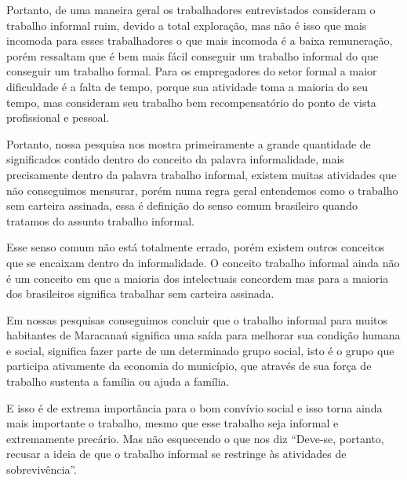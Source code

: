 Portanto, de uma maneira geral os trabalhadores entrevistados consideram o trabalho informal ruim, devido a total exploração, mas não é isso que mais incomoda para esses trabalhadores o que mais incomoda é a baixa remuneração, porém ressaltam que é bem mais fácil conseguir um trabalho informal do que conseguir um trabalho formal. Para os empregadores do setor formal a maior dificuldade é a falta de tempo, porque sua atividade toma a maioria do seu tempo, mas consideram seu trabalho bem recompensatório do ponto de vista profissional e pessoal. 




































Portanto, nossa pesquisa nos mostra primeiramente a grande quantidade de 
significados contido dentro do conceito da palavra informalidade, mais 
precisamente dentro da palavra trabalho informal, existem muitas atividades que 
não conseguimos mensurar, porém numa regra geral entendemos como o trabalho sem 
carteira assinada, essa é definição do senso comum brasileiro quando tratamos do 
assunto trabalho informal. 

Esse senso comum não está totalmente errado, porém 
existem outros conceitos que se encaixam dentro da informalidade. O conceito 
trabalho informal ainda não é um conceito em que a maioria dos intelectuais 
concordem mas para a maioria dos brasileiros significa trabalhar sem carteira 
assinada.

Em nossas pesquisas conseguimos concluir que o trabalho informal para muitos 
habitantes de Maracanaú significa uma saída para melhorar sua condição humana e 
social, significa fazer parte de um determinado grupo social, isto é o grupo que 
participa ativamente da economia do município, que através de sua força de 
trabalho sustenta a família ou ajuda a família. 

E isso é de extrema importância 
para o bom convívio social e isso torna ainda mais importante o trabalho, mesmo 
que esse trabalho seja informal e extremamente precário. Mas não esquecendo o 
que \cite{augusta} nos diz ``Deve-se, portanto, recusar a ideia de que o 
trabalho informal se restringe às atividades de sobrevivência''. 

